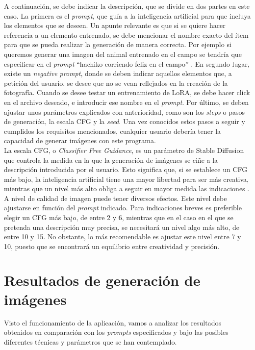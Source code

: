 A continuación, se debe indicar la descripción, que se divide en dos partes en este caso. La primera es el \textit{prompt}, que guía a la inteligencia artificial para que incluya los elementos que se deseen. Un apunte relevante es que si se quiere hacer referencia a un elemento entrenado, se debe mencionar el nombre exacto del ítem para que se pueda realizar la generación de manera correcta. Por ejemplo si queremos generar una imagen del animal entrenado en el campo se tendría que especificar en el \textit{prompt} ``hachiko corriendo feliz en el campo'' . En segundo lugar, existe un \textit{negative prompt}, donde se deben indicar aquellos elementos que, a petición del usuario, se desee que no se vean reflejados en la creación de la fotografía. Cuando se desee testar un entrenamiento de LoRA, se debe hacer click en el archivo deseado, e introducir ese nombre en el \textit{prompt}. Por último, se deben ajustar unos parámetros explicados con anterioridad, como son los \textit{steps} o pasos de generación, la escala CFG y la \textit{seed}. Una vez conocidos estos pasos a seguir y cumplidos los requisitos mencionados, cualquier usuario debería tener la capacidad de generar imágenes con este programa.\\ 

La escala CFG, o \textit{Classifier Free Guidance}, es un parámetro de Stable Diffusion que controla la medida en la que la generación de imágenes se ciñe a la descripción introducida por el usuario. Esto significa que, si se establece un CFG más bajo, la inteligencia artificial tiene una mayor libertad para ser más creativa, mientras que un nivel más alto obliga a seguir en mayor medida las indicaciones  \citep{FelixSanzSD}. A nivel de calidad de imagen puede tener diversos efectos. Este nivel debe ajustarse en función del \textit{prompt} indicado. Para indicaciones breves es preferible elegir un CFG más bajo, de entre 2 y 6, mientras que en el caso en el que se pretenda una descripción muy precisa, se necesitará un nivel algo más alto, de entre 10 y 15. No obstante, lo más recomendable es ajustar este nivel entre 7 y 10, puesto que se encontrará un equilibrio entre creatividad y precisión.


\section{Resultados de generación de imágenes}

Visto el funcionamiento de la aplicación, vamos a analizar los resultados obtenidos en comparación con los \textit{prompts} especificados y bajo las posibles diferentes técnicas y parámetros que se han contemplado.


